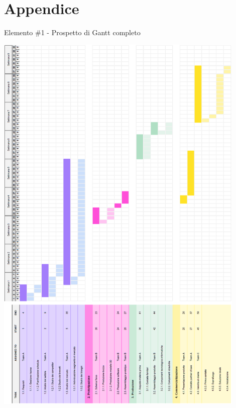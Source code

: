 \documentclass[a4paper, 12pt]{article}
\begin{document}
	\section{Appendice}
	Elemento \#1 - Prospetto di Gantt completo
	\begin{center}
		\includegraphics[width=0.9\textwidth]{Images/gantt_full.png}
	\end{center}
\end{document}
